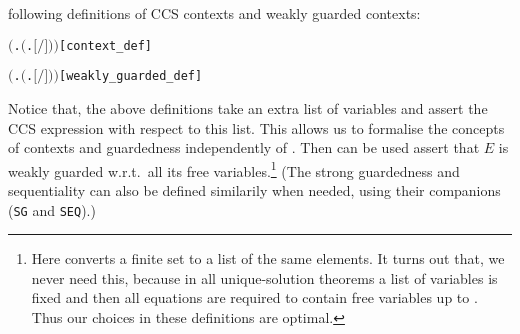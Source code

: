 following definitions of CCS contexts and weakly guarded contexts:
\begin{alltt}
      \HOLSymConst{\HOLTokenDefEquality{}}  \ensuremath{(}\HOLTokenLambda{}.  \ensuremath{(}\HOLTokenLambda{}. \ensuremath{[}\ensuremath{/}\ensuremath{]} \ensuremath{)}\ensuremath{)} \hfill{[context_def]}

      \HOLSymConst{\HOLTokenDefEquality{}}  \ensuremath{(}\HOLTokenLambda{}.  \ensuremath{(}\HOLTokenLambda{}. \ensuremath{[}\ensuremath{/}\ensuremath{]} \ensuremath{)}\ensuremath{)} \hfill{[weakly_guarded_def]}
\end{alltt}
Notice that, the above definitions take an extra list of variables  and
assert the CCS expression  with respect to this list. This
allows us to formalise the concepts of contexts and guardedness
independently of . Then  can
be used assert that $E$ is weakly guarded w.r.t.~all its free
variables.\footnote{Here  converts a finite set
  to a list of the same elements. It turns out that, we never need this, because
  in all unique-solution theorems a list of variables  is fixed and
  then all equations are required to contain free variables up to
  . Thus our choices in these definitions are optimal.}
(The strong guardedness and sequentiality can also be defined similarily
when needed, using
their \univariate companions (\texttt{SG} and \texttt{SEQ}).)

